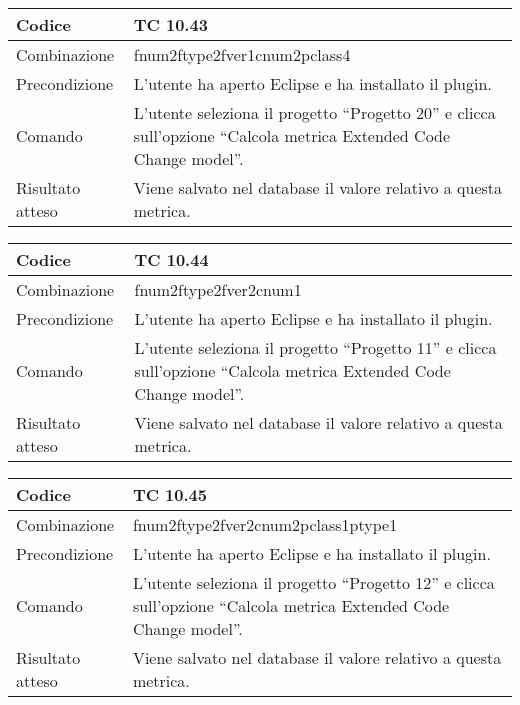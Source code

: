 \clearpage

\begin{table}[ht]
\begin{tabular}{|p{3cm}|p{9cm}|}
\hline
\cellcolor{lightgray}Codice				& TC 10.43								\\
\hline
\cellcolor{lightgray}Combinazione		& fnum2ftype2fver1cnum2pclass4									\\
\hline
\cellcolor{lightgray}Precondizione		& L'utente ha aperto Eclipse e ha installato il plugin.		\\
\hline
\cellcolor{lightgray}Comando			& L'utente seleziona il progetto ``Progetto 20''  e clicca sull'opzione ``Calcola metrica Extended Code Change model''.	\\
\hline
\cellcolor{lightgray}Risultato atteso	& Viene salvato nel database il valore relativo a questa metrica.\\
\hline
\end{tabular}
\end{table}

\begin{table}[ht]
\begin{tabular}{|p{3cm}|p{9cm}|}
\hline
\cellcolor{lightgray}Codice				& TC 10.44								\\
\hline
\cellcolor{lightgray}Combinazione		& fnum2ftype2fver2cnum1									\\
\hline
\cellcolor{lightgray}Precondizione		& L'utente ha aperto Eclipse e ha installato il plugin.		\\
\hline
\cellcolor{lightgray}Comando			& L'utente seleziona il progetto ``Progetto 11''  e clicca sull'opzione ``Calcola metrica Extended Code Change model''.	\\
\hline
\cellcolor{lightgray}Risultato atteso	& Viene salvato nel database il valore relativo a questa metrica.\\
\hline
\end{tabular}
\end{table}

\begin{table}[ht]
\begin{tabular}{|p{3cm}|p{9cm}|}
\hline
\cellcolor{lightgray}Codice				& TC 10.45								\\
\hline
\cellcolor{lightgray}Combinazione		& fnum2ftype2fver2cnum2pclass1ptype1									\\
\hline
\cellcolor{lightgray}Precondizione		& L'utente ha aperto Eclipse e ha installato il plugin.		\\
\hline
\cellcolor{lightgray}Comando			& L'utente seleziona il progetto ``Progetto 12''  e clicca sull'opzione ``Calcola metrica Extended Code Change model''.	\\
\hline
\cellcolor{lightgray}Risultato atteso	& Viene salvato nel database il valore relativo a questa metrica.\\
\hline
\end{tabular}
\end{table}


